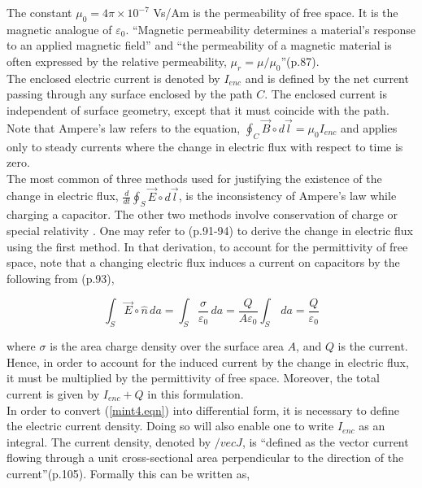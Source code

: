 \documentclass[12pt]{article}
\theoremstyle{definition}
\numberwithin{equation}{section}
\begin{document}
The constant $\mu_{0}=4\pi \times 10^{-7}$ \si{Vs/Am} is the permeability of free space. It is the magnetic analogue of $\varepsilon_{0}$. \enquote{Magnetic permeability determines a material's response to an applied magnetic field} and \enquote{the permeability of a magnetic material is often expressed by the relative permeability, $\mu_{r}=\mu / \mu_{0}$}(p.87)\cite{Flei}.\\

The enclosed electric current is denoted by $I_{enc}$ and is defined by the net current passing through any surface enclosed by the path $C$. The enclosed current is independent of surface geometry, except that it must coincide with the path. Note that Ampere's law refers to the equation, $\oint_{C}\vec{B}\circ d\vec{l}=\mu_{0}I_{enc}$ and applies only to steady currents where the change in electric flux with respect to time is zero.\\

The most common of three methods used for justifying the existence of the change in electric flux, $\tfrac{d}{dt}\oint_{S}\vec{E}\circ d\vec{l}$, is the inconsistency of Ampere's law while charging a capacitor. The other two methods involve conservation of charge or special relativity \cite{Flei}. One may refer to (p.91-94)\cite{Flei} to derive the change in electric flux using the first method. In that derivation, to account for the permittivity of free space, note that a changing electric flux induces a current on capacitors by the following from (p.93)\cite{Flei},

\begin{equation}
\int_{S}\vec{E}\circ\hat{n}\,da= \int_{S}\frac{\sigma}{\varepsilon_{0}}\,da=\frac{Q}{A\varepsilon_{0}}\int_{S}\,da=\frac{Q}{\varepsilon_{0}}
\end{equation}

where $\sigma$ is the area charge density over the surface area $A$, and $Q$ is the current. Hence, in order to account for the induced current by the change in electric flux, it must be multiplied by the permittivity of free space. Moreover, the total current is given by $I_{enc}+Q$ in this formulation.\\

In order to convert (\ref{mint4.eqn}) into differential form, it is necessary to define the electric current density. Doing so will also enable one to write $I_{enc}$ as an integral. The current density, denoted by $/vec{J}$, is \enquote{defined as the vector current flowing through a unit cross-sectional area perpendicular to the direction of the current}(p.105)\cite{Flei}. Formally this can be written as,
\end{document}
